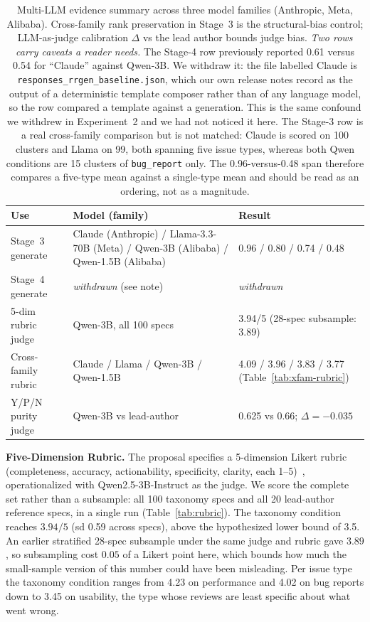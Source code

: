 \documentclass[sigconf, anonymous]{acmart}
\begin{document}
\begin{table}[t]\centering\footnotesize
\caption{Multi-LLM evidence summary across three model families (Anthropic, Meta, Alibaba).
Cross-family rank preservation in Stage~3 is the structural-bias control; LLM-as-judge
calibration $\Delta$ vs the lead author bounds judge bias. \emph{Two rows carry caveats a reader
needs.} The Stage-4 row previously reported 0.61 versus 0.54 for ``Claude'' against Qwen-3B. We
withdraw it: the file labelled Claude is \texttt{responses\_rrgen\_baseline.json}, which our own
release notes record as the output of a deterministic template composer rather than of any
language model, so the row compared a template against a generation. This is the same confound we
withdrew in Experiment~2 and we had not noticed it here. The Stage-3 row is a real cross-family
comparison but is not matched: Claude is scored on 100 clusters and Llama on 99, both spanning
five issue types, whereas both Qwen conditions are 15 clusters of \texttt{bug\_report} only. The
0.96-versus-0.48 span therefore compares a five-type mean against a single-type mean and should be
read as an ordering, not as a magnitude.}\label{tab:multi-llm}
\begin{tabular}{@{}p{2.7cm}p{2.9cm}p{2.4cm}@{}}\toprule
Use & Model (family) & Result \\\midrule
Stage~3 generate & Claude (Anthropic) / Llama-3.3-70B (Meta) / Qwen-3B (Alibaba) / Qwen-1.5B (Alibaba) & 0.96 / 0.80 / 0.74 / 0.48 \\
Stage~4 generate & \emph{withdrawn} (see note) & \emph{withdrawn} \\
5-dim rubric judge & Qwen-3B, all 100 specs & 3.94/5 (28-spec subsample: 3.89) \\
Cross-family rubric & Claude / Llama / Qwen-3B / Qwen-1.5B & 4.09 / 3.96 / 3.83 / 3.77 (Table~\ref{tab:xfam-rubric}) \\
Y/P/N purity judge & Qwen-3B vs lead-author & 0.625 vs 0.66; $\Delta=-0.035$ \\
\bottomrule\end{tabular}\end{table}

\textbf{Five-Dimension Rubric.} The proposal specifies a 5-dimension Likert rubric
(completeness, accuracy, actionability, specificity, clarity, each 1--5)~\cite{gilardi2023chatgpt,
pangakis2023automated, zheng2023judging}, operationalized with Qwen2.5-3B-Instruct as the judge.
We score the complete set rather than a subsample: all 100 taxonomy specs and all 20 lead-author
reference specs, in a single run (Table~\ref{tab:rubric}). The taxonomy condition reaches
$3.94/5$ (sd 0.59 across specs), above the hypothesized lower bound of 3.5. An earlier stratified
28-spec subsample under the same judge and rubric gave $3.89$, so subsampling cost $0.05$ of a
Likert point here, which bounds how much the small-sample version of this number could have been
misleading. Per issue type the taxonomy condition ranges from 4.23 on performance and 4.02 on
bug reports down to 3.45 on usability, the type whose reviews are least specific about what
went wrong.
\end{document}

